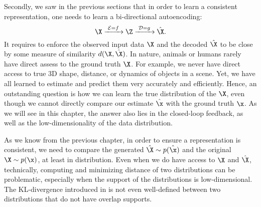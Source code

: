 \documentclass[../../book-main.tex]{subfiles}
\begin{document}
Secondly, we saw in the previous sections that in order to learn a consistent representation, one needs to learn a bi-directional autoencoding:
\begin{equation}
 \X
\xrightarrow{\hspace{1mm} \mathcal{E} = f \hspace{1mm}} \Z  \xrightarrow{\hspace{1mm} \mathcal{D} = g \hspace{1mm}} \hat{\X}.
\end{equation}
It requires to enforce the observed input data $\X$ and the decoded $\hat \X$ to be close by some measure of similarity $d(\X, \hat \X)$. In nature, animals or humans rarely have direct assess to the ground truth $\X$. For example, we never have direct access to true 3D shape, distance, or dynamics of objects in a scene. Yet, we have all learned to estimate and predict them very accurately and efficiently. Hence, an outstanding question is how we can learn the true distribution of the $\X$, even though we cannot directly compare our estimate $\hat \x$ with the ground truth $\x$. As we will see in this chapter, the answer also  lies in the closed-loop feedback, as well as the low-dimensionality of the data distribution. 






As we know from the previous chapter, in order to ensure a representation is consistent, we need to compare the generated $\hat \X \sim p(\hat\x)$ and the original $\X \sim p(\x)$, at least in distribution. Even when we do have access to $\X$ and $\hat \X$, technically, computing and minimizing distance of two distributions can be problematic, especially when the support of the distributions is low-dimensional. The KL-divergence introduced in  is not even well-defined between two distributions that do not have overlap supports. 
\end{document}
